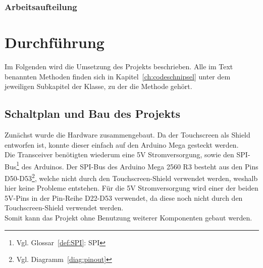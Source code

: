 \documentclass[a4paper, 11pt]{scrartcl}
\begin{document}
\subsubsection{Arbeitsaufteilung}

\section{Durchführung}
Im Folgenden wird die Umsetzung des Projekts beschrieben. Alle im Text benannten Methoden finden sich in Kapitel~\ref{ch:codeschnipsel} unter dem jeweiligen Subkapitel
der Klasse, zu der die Methode gehört.

\subsection{Schaltplan und Bau des Projekts}
Zunächst wurde die Hardware zusammengebaut. Da der Touchscreen als Shield entworfen ist, konnte dieser einfach auf den Arduino Mega gesteckt werden.
\\
Die Transceiver benötigten wiederum eine 5V Stromversorgung, sowie den SPI-Bus\footnote{Vgl. Glossar~\ref{def:SPI}: SPI} des Arduinos. Der SPI-Bus des Arduino Mega
2560 R3 besteht aus den Pins D50-D53\footnote{Vgl. Diagramm~\ref{diag:pinout}}, welche nicht durch den Touchscreen-Shield verwendet werden, weshalb hier keine Probleme
entstehen. Für die 5V Stromversorgung wird einer der beiden 5V-Pins in der Pin-Reihe D22-D53 verwendet, da diese noch nicht durch den Touchscreen-Shield verwendet werden.
\\
Somit kann das Projekt ohne Benutzung weiterer Komponenten gebaut werden. 
\end{document}
